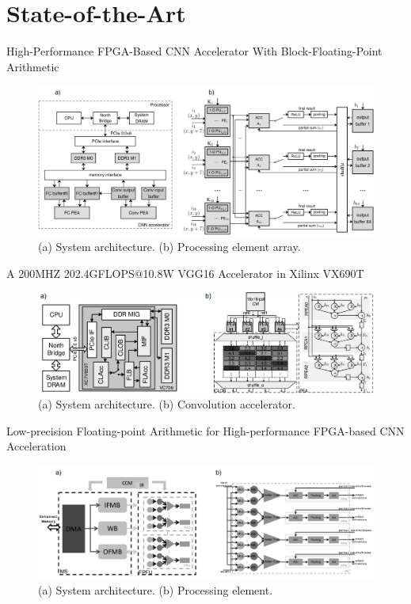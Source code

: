 	\section{State-of-the-Art}
	\tableofcontents[currentsection]
	
	\begin{frame}{High-Performance FPGA-Based CNN Accelerator With Block-Floating-Point Arithmetic}
		\centering
		\begin{figure}
			\includegraphics[width=\textwidth]{../figures/3_g.png}
			\caption{(a) System architecture. (b) Processing element array.}
		\end{figure}
	\end{frame}
	
	\begin{frame}{A 200MHZ 202.4GFLOPS@10.8W VGG16 Accelerator in Xilinx VX690T}
		\centering
		\begin{figure}
			\includegraphics[width=\textwidth]{../figures/1_g.png}
			\caption{(a) System architecture. (b) Convolution accelerator.}
		\end{figure}
	\end{frame}
	
	\begin{frame}{Low-precision Floating-point Arithmetic for High-performance FPGA-based CNN Acceleration}
		\centering
		\begin{figure}
			\includegraphics[width=\textwidth]{../figures/2_g.png}
			\caption{(a) System architecture. (b) Processing element.}
		\end{figure}
	\end{frame}

